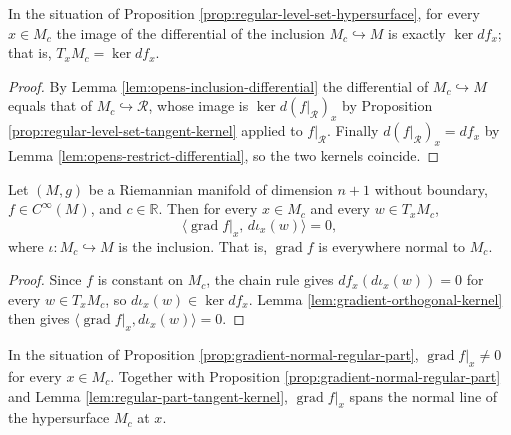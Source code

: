 \begin{lemma}
\label{lem:regular-part-tangent-kernel}
\leanok
{}
In the situation of Proposition \ref{prop:regular-level-set-hypersurface}, for every $x \in M_c$ the image of the differential of the inclusion $M_c \hookrightarrow M$ is exactly $\ker df_x$; that is, $T_x M_c = \ker df_x$.
\end{lemma}

\begin{proof}
\leanok
{}
By Lemma \ref{lem:opens-inclusion-differential} the differential of $M_c \hookrightarrow M$ equals that of $M_c \hookrightarrow \mathcal{R}$, whose image is $\ker d(f|_{\mathcal{R}})_x$ by Proposition \ref{prop:regular-level-set-tangent-kernel} applied to $f|_{\mathcal{R}}$. Finally $d(f|_{\mathcal{R}})_x = df_x$ by Lemma \ref{lem:opens-restrict-differential}, so the two kernels coincide.
\end{proof}

\begin{proposition}
\label{prop:gradient-normal-regular-part}
\leanok
{}
Let $(M,g)$ be a Riemannian manifold of dimension $n+1$ without boundary, $f \in C^\infty(M)$, and $c \in \mathbb{R}$. Then for every $x \in M_c$ and every $w \in T_x M_c$,
\[
  \bigl\langle \operatorname{grad} f|_{x},\, d\iota_{x}(w) \bigr\rangle = 0 ,
\]
where $\iota : M_c \hookrightarrow M$ is the inclusion. That is, $\operatorname{grad} f$ is everywhere normal to $M_c$.
\end{proposition}

\begin{proof}
\leanok
{}
Since $f$ is constant on $M_c$, the chain rule gives $df_x(d\iota_x(w)) = 0$ for every $w \in T_x M_c$, so $d\iota_x(w) \in \ker df_x$. Lemma \ref{lem:gradient-orthogonal-kernel} then gives $\langle \operatorname{grad} f|_x, d\iota_x(w)\rangle = 0$.
\end{proof}

\begin{lemma}
\label{lem:gradient-nonvanishing-regular-part}
\leanok
{}
In the situation of Proposition \ref{prop:gradient-normal-regular-part}, $\operatorname{grad} f|_x \neq 0$ for every $x \in M_c$. Together with Proposition \ref{prop:gradient-normal-regular-part} and Lemma \ref{lem:regular-part-tangent-kernel}, $\operatorname{grad} f|_x$ spans the normal line of the hypersurface $M_c$ at $x$.
\end{lemma}

